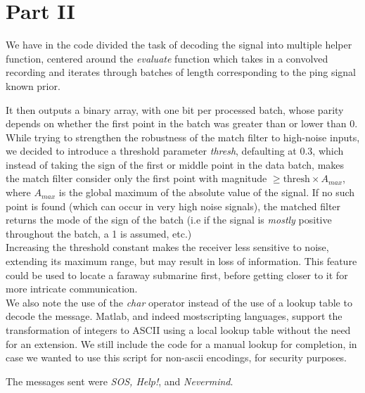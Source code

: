 \documentclass{article}
\begin{document}
\section{Part II}
We have in the code divided the task of decoding the signal into multiple helper function, centered around the \emph{evaluate} function which takes in a convolved recording and iterates through batches of length corresponding to the ping signal known prior.

It then outputs a binary array, with one bit per processed batch, whose parity depends on whether the first point in the batch was greater than or lower than 0.
While trying to strengthen the robustness of the match filter to high-noise inputs, we decided to introduce a threshold parameter \emph{thresh}, defaulting at 0.3, which instead of taking the sign of the first or middle point in the data batch, makes the match filter consider only the first point with magnitude $\geq \text{thresh}\times A_{max}$, where $A_{max}$ is the global maximum of the absolute value of the signal. If no such point is found (which can occur in very high noise signals), the matched filter returns the mode of the sign of the batch (i.e if the signal is \emph{mostly} positive throughout the batch, a 1 is assumed, etc.) \\

Increasing the threshold constant makes the receiver less sensitive to noise, extending its maximum range, but may result in loss of information. This feature could be used to locate a faraway submarine first, before getting closer to it for more intricate communication.\\

We also note the use of the \emph{char} operator instead of the use of a lookup table to decode the message. Matlab, and indeed mostscripting languages, support the transformation of integers to ASCII using a local lookup table without the need for an extension. We still include the code for a manual lookup for completion, in case we wanted to use this script for non-ascii encodings, for security purposes.

The messages sent were \emph{SOS, Help!}, and \emph{Nevermind}.
\end{document}

